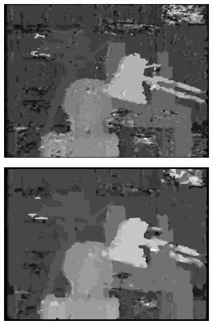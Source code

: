 \documentclass[a4paper]{scrartcl}
\begin{document}
\vspace{1cm}
\begin{minipage}{0.8\textwidth}
  \centering
  \includegraphics[width=0.8\textwidth]{disparity-r1-ssd-d20-m1.png}
  \label{fig:disparity-r1-ssd-d20-m1}
\end{minipage}

\vspace{1cm}
\begin{minipage}{0.8\textwidth}
  \centering
  \includegraphics[width=0.8\textwidth]{disparity-r3-ssd-d20-m1.png}
  \label{fig:disparity-r3-ssd-d20-m1}
\end{minipage}
\end{document}
